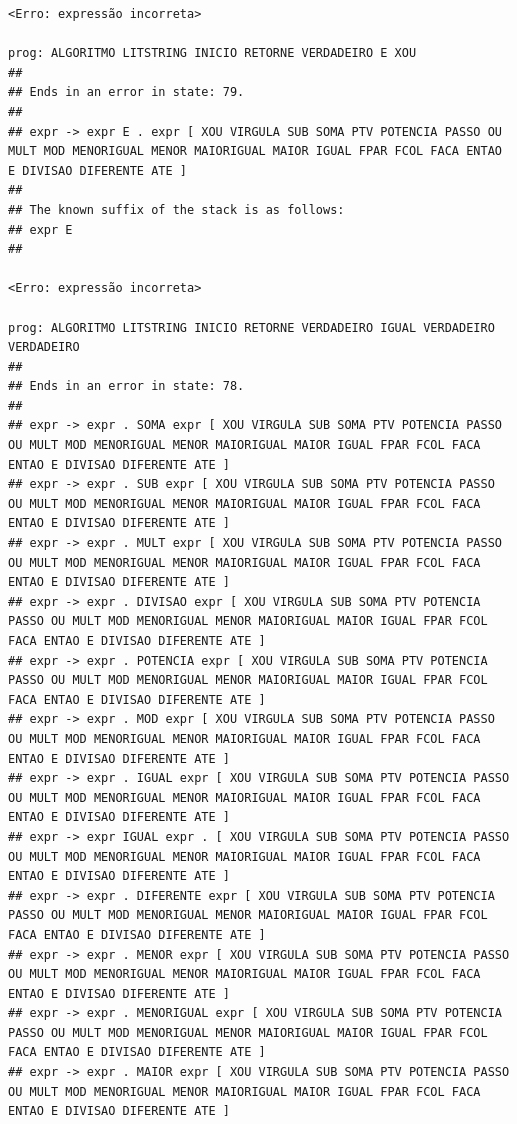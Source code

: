 \documentclass[hidelinks,12pt]{article}
\begin{document}
\begin{lstlisting}
<Erro: expressão incorreta>

prog: ALGORITMO LITSTRING INICIO RETORNE VERDADEIRO E XOU 
##
## Ends in an error in state: 79.
##
## expr -> expr E . expr [ XOU VIRGULA SUB SOMA PTV POTENCIA PASSO OU MULT MOD MENORIGUAL MENOR MAIORIGUAL MAIOR IGUAL FPAR FCOL FACA ENTAO E DIVISAO DIFERENTE ATE ]
##
## The known suffix of the stack is as follows:
## expr E 
##

<Erro: expressão incorreta>

prog: ALGORITMO LITSTRING INICIO RETORNE VERDADEIRO IGUAL VERDADEIRO VERDADEIRO 
##
## Ends in an error in state: 78.
##
## expr -> expr . SOMA expr [ XOU VIRGULA SUB SOMA PTV POTENCIA PASSO OU MULT MOD MENORIGUAL MENOR MAIORIGUAL MAIOR IGUAL FPAR FCOL FACA ENTAO E DIVISAO DIFERENTE ATE ]
## expr -> expr . SUB expr [ XOU VIRGULA SUB SOMA PTV POTENCIA PASSO OU MULT MOD MENORIGUAL MENOR MAIORIGUAL MAIOR IGUAL FPAR FCOL FACA ENTAO E DIVISAO DIFERENTE ATE ]
## expr -> expr . MULT expr [ XOU VIRGULA SUB SOMA PTV POTENCIA PASSO OU MULT MOD MENORIGUAL MENOR MAIORIGUAL MAIOR IGUAL FPAR FCOL FACA ENTAO E DIVISAO DIFERENTE ATE ]
## expr -> expr . DIVISAO expr [ XOU VIRGULA SUB SOMA PTV POTENCIA PASSO OU MULT MOD MENORIGUAL MENOR MAIORIGUAL MAIOR IGUAL FPAR FCOL FACA ENTAO E DIVISAO DIFERENTE ATE ]
## expr -> expr . POTENCIA expr [ XOU VIRGULA SUB SOMA PTV POTENCIA PASSO OU MULT MOD MENORIGUAL MENOR MAIORIGUAL MAIOR IGUAL FPAR FCOL FACA ENTAO E DIVISAO DIFERENTE ATE ]
## expr -> expr . MOD expr [ XOU VIRGULA SUB SOMA PTV POTENCIA PASSO OU MULT MOD MENORIGUAL MENOR MAIORIGUAL MAIOR IGUAL FPAR FCOL FACA ENTAO E DIVISAO DIFERENTE ATE ]
## expr -> expr . IGUAL expr [ XOU VIRGULA SUB SOMA PTV POTENCIA PASSO OU MULT MOD MENORIGUAL MENOR MAIORIGUAL MAIOR IGUAL FPAR FCOL FACA ENTAO E DIVISAO DIFERENTE ATE ]
## expr -> expr IGUAL expr . [ XOU VIRGULA SUB SOMA PTV POTENCIA PASSO OU MULT MOD MENORIGUAL MENOR MAIORIGUAL MAIOR IGUAL FPAR FCOL FACA ENTAO E DIVISAO DIFERENTE ATE ]
## expr -> expr . DIFERENTE expr [ XOU VIRGULA SUB SOMA PTV POTENCIA PASSO OU MULT MOD MENORIGUAL MENOR MAIORIGUAL MAIOR IGUAL FPAR FCOL FACA ENTAO E DIVISAO DIFERENTE ATE ]
## expr -> expr . MENOR expr [ XOU VIRGULA SUB SOMA PTV POTENCIA PASSO OU MULT MOD MENORIGUAL MENOR MAIORIGUAL MAIOR IGUAL FPAR FCOL FACA ENTAO E DIVISAO DIFERENTE ATE ]
## expr -> expr . MENORIGUAL expr [ XOU VIRGULA SUB SOMA PTV POTENCIA PASSO OU MULT MOD MENORIGUAL MENOR MAIORIGUAL MAIOR IGUAL FPAR FCOL FACA ENTAO E DIVISAO DIFERENTE ATE ]
## expr -> expr . MAIOR expr [ XOU VIRGULA SUB SOMA PTV POTENCIA PASSO OU MULT MOD MENORIGUAL MENOR MAIORIGUAL MAIOR IGUAL FPAR FCOL FACA ENTAO E DIVISAO DIFERENTE ATE ]

\end{lstlisting}
\end{document}

